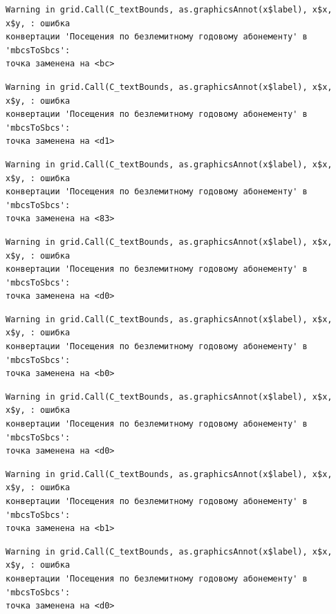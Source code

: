 \documentclass[
  letterpaper,
  DIV=11,
  numbers=noendperiod]{scrreprt}
\begin{document}
\begin{verbatim}
Warning in grid.Call(C_textBounds, as.graphicsAnnot(x$label), x$x, x$y, : ошибка
конвертации 'Посещения по безлемитному годовому абонементу' в 'mbcsToSbcs':
точка заменена на <bc>
\end{verbatim}

\begin{verbatim}
Warning in grid.Call(C_textBounds, as.graphicsAnnot(x$label), x$x, x$y, : ошибка
конвертации 'Посещения по безлемитному годовому абонементу' в 'mbcsToSbcs':
точка заменена на <d1>
\end{verbatim}

\begin{verbatim}
Warning in grid.Call(C_textBounds, as.graphicsAnnot(x$label), x$x, x$y, : ошибка
конвертации 'Посещения по безлемитному годовому абонементу' в 'mbcsToSbcs':
точка заменена на <83>
\end{verbatim}

\begin{verbatim}
Warning in grid.Call(C_textBounds, as.graphicsAnnot(x$label), x$x, x$y, : ошибка
конвертации 'Посещения по безлемитному годовому абонементу' в 'mbcsToSbcs':
точка заменена на <d0>
\end{verbatim}

\begin{verbatim}
Warning in grid.Call(C_textBounds, as.graphicsAnnot(x$label), x$x, x$y, : ошибка
конвертации 'Посещения по безлемитному годовому абонементу' в 'mbcsToSbcs':
точка заменена на <b0>
\end{verbatim}

\begin{verbatim}
Warning in grid.Call(C_textBounds, as.graphicsAnnot(x$label), x$x, x$y, : ошибка
конвертации 'Посещения по безлемитному годовому абонементу' в 'mbcsToSbcs':
точка заменена на <d0>
\end{verbatim}

\begin{verbatim}
Warning in grid.Call(C_textBounds, as.graphicsAnnot(x$label), x$x, x$y, : ошибка
конвертации 'Посещения по безлемитному годовому абонементу' в 'mbcsToSbcs':
точка заменена на <b1>
\end{verbatim}

\begin{verbatim}
Warning in grid.Call(C_textBounds, as.graphicsAnnot(x$label), x$x, x$y, : ошибка
конвертации 'Посещения по безлемитному годовому абонементу' в 'mbcsToSbcs':
точка заменена на <d0>
\end{verbatim}
\end{document}
